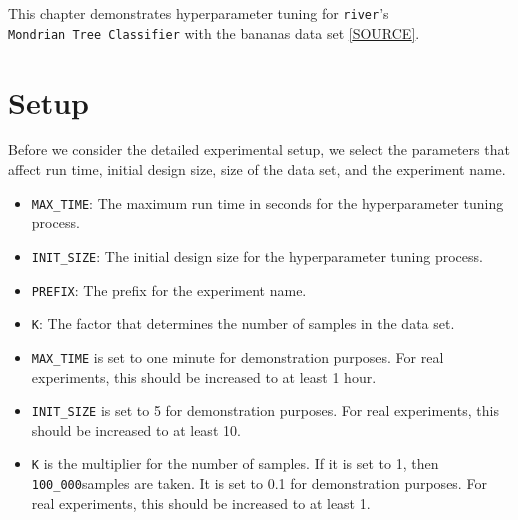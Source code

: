 \documentclass[
  letterpaper,
  DIV=11,
  numbers=noendperiod]{scrreprt}
\providecommand{\tightlist}{%
  \setlength{\itemsep}{0pt}\setlength{\parskip}{0pt}}\usepackage{longtable,booktabs,array}
\begin{document}
This chapter demonstrates hyperparameter tuning for \texttt{river}'s
\texttt{Mondrian\ Tree\ Classifier} with the bananas data set
\href{https://riverml.xyz/0.19.0/api/datasets/Bananas/}{{[}SOURCE{]}}.

\hypertarget{sec-setup-13}{%
\section{Setup}\label{sec-setup-13}}

Before we consider the detailed experimental setup, we select the
parameters that affect run time, initial design size, size of the data
set, and the experiment name.

\begin{itemize}
\tightlist
\item
  \texttt{MAX\_TIME}: The maximum run time in seconds for the
  hyperparameter tuning process.
\item
  \texttt{INIT\_SIZE}: The initial design size for the hyperparameter
  tuning process.
\item
  \texttt{PREFIX}: The prefix for the experiment name.
\item
  \texttt{K}: The factor that determines the number of samples in the
  data set.
\end{itemize}

\begin{tcolorbox}[enhanced jigsaw, left=2mm, toprule=.15mm, colframe=quarto-callout-caution-color-frame, leftrule=.75mm, title=\textcolor{quarto-callout-caution-color}{\faFire}\hspace{0.5em}{Caution: Run time and initial design size should be increased for real
experiments}, toptitle=1mm, opacitybacktitle=0.6, arc=.35mm, titlerule=0mm, opacityback=0, bottomtitle=1mm, coltitle=black, rightrule=.15mm, colback=white, colbacktitle=quarto-callout-caution-color!10!white, breakable, bottomrule=.15mm]

\begin{itemize}
\tightlist
\item
  \texttt{MAX\_TIME} is set to one minute for demonstration purposes.
  For real experiments, this should be increased to at least 1 hour.
\item
  \texttt{INIT\_SIZE} is set to 5 for demonstration purposes. For real
  experiments, this should be increased to at least 10.
\item
  \texttt{K} is the multiplier for the number of samples. If it is set
  to 1, then \texttt{100\_000}samples are taken. It is set to 0.1 for
  demonstration purposes. For real experiments, this should be increased
  to at least 1.
\end{itemize}

\end{tcolorbox}
\end{document}
